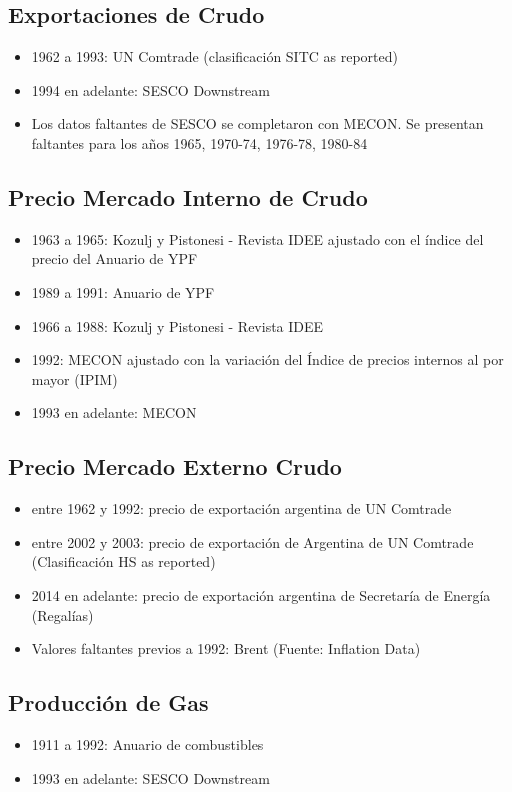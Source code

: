 \documentclass[letterpaper,11pt, spanish]{scrartcl}
\begin{document}
\subsection{Exportaciones de Crudo}
\begin{itemize}
    \item 1962 a 1993: UN Comtrade (clasificación SITC as reported)
    \item 1994 en adelante: SESCO Downstream
    \item Los datos faltantes de SESCO se completaron con MECON. Se presentan faltantes para los años 1965, 1970-74, 1976-78, 1980-84 
\end{itemize}
  
\subsection{Precio Mercado Interno de Crudo}
\begin{itemize}
    \item 1963 a 1965: Kozulj y Pistonesi - Revista IDEE ajustado con el índice del precio del Anuario de YPF 
    \item 1989 a 1991: Anuario de YPF
    \item 1966 a 1988: Kozulj y Pistonesi - Revista IDEE
    \item 1992: MECON ajustado con la variación del Índice de precios internos al por mayor (IPIM)
    \item 1993 en adelante: MECON
\end{itemize}
   
\subsection{Precio Mercado Externo Crudo}
\begin{itemize}
    \item entre 1962 y 1992: precio de exportación argentina de UN Comtrade
    \item entre 2002 y 2003: precio de exportación de Argentina de UN Comtrade (Clasificación HS as reported) 
    \item 2014 en adelante: precio de exportación argentina de Secretaría de Energía (Regalías)
    \item Valores faltantes previos a 1992: Brent  (Fuente: Inflation Data)
\end{itemize}

\subsection{Producción de Gas}
\begin{itemize}
    \item 1911 a 1992: Anuario de combustibles
    \item 1993 en adelante: SESCO Downstream
\end{itemize}
\end{document}
